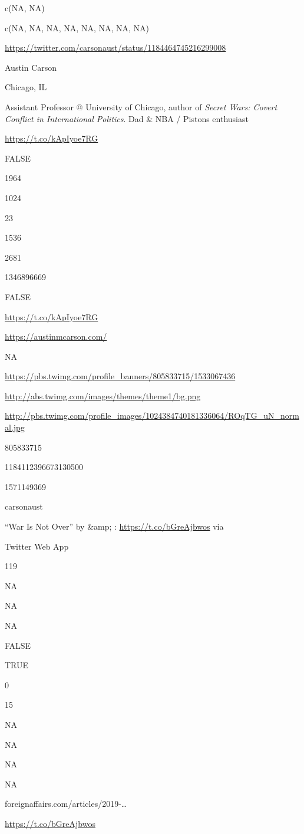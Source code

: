 \documentclass[]{book}
\begin{document}
c(NA, NA)

c(NA, NA, NA, NA, NA, NA, NA, NA)

\url{https://twitter.com/carsonaust/status/1184464745216299008}

Austin Carson

Chicago, IL

Assistant Professor @ University of Chicago, author of \emph{Secret Wars: Covert Conflict in International Politics}. Dad \& NBA / Pistons enthusiast

\url{https://t.co/kApIyoe7RG}

FALSE

1964

1024

23

1536

2681

1346896669

FALSE

\url{https://t.co/kApIyoe7RG}

\url{https://austinmcarson.com/}

NA

\url{https://pbs.twimg.com/profile_banners/805833715/1533067436}

\url{http://abs.twimg.com/images/themes/theme1/bg.png}

\url{http://pbs.twimg.com/profile_images/1024384740181336064/ROqTG_uN_normal.jpg}

805833715

1184112396673130500

1571149369

carsonaust

``War Is Not Over'' by \citet{tanishafazal} \&amp; \citet{ProfPaulPoast}: \url{https://t.co/bGreAjbwos} via \citet{ForeignAffairs}

Twitter Web App

119

NA

NA

NA

FALSE

TRUE

0

15

NA

NA

NA

NA

foreignaffairs.com/articles/2019-\ldots{}

\url{https://t.co/bGreAjbwos}
\end{document}
